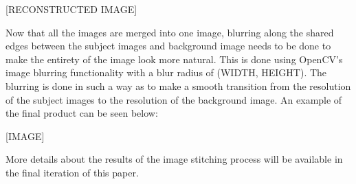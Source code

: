[RECONSTRUCTED IMAGE]

Now that all the images are merged into one image, blurring along the shared
edges between the subject images and background image needs to be done to make
the entirety of the image look more natural. This is done using OpenCV’s image
blurring functionality with a blur radius of (WIDTH, HEIGHT). The blurring is
done in such a way as to make a smooth transition from the resolution of the
subject images to the resolution of the background image. An example of the
final product can be seen below:

[IMAGE]

More details about the results of the image stitching process will be available
in the final iteration of this paper.
